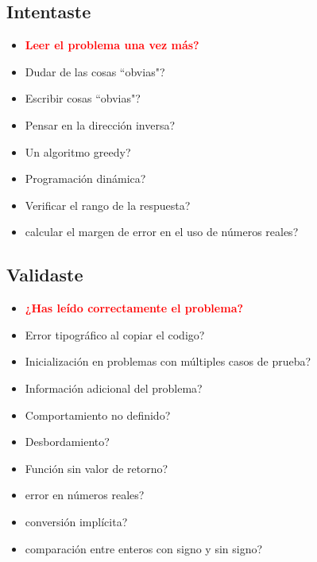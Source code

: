 \subsection{Intentaste}

\begin{itemize}
    \item \textcolor{red}{\textbf{Leer el problema una vez más?}}
    \item Dudar de las cosas ``obvias"?
    \item Escribir cosas ``obvias"?
    \item Pensar en la dirección inversa?
    \item Un algoritmo greedy?
    \item Programación dinámica?
    \item Verificar el rango de la respuesta?
    \item calcular el margen de error en el uso de números reales?
\end{itemize}

\subsection{Validaste}

\begin{itemize}
    \item \textcolor{red}{\textbf{¿Has leído correctamente el problema?}}
    \item Error tipográfico al copiar el codigo?
    \item Inicialización en problemas con múltiples casos de prueba?
    \item Información adicional del problema?
    \item Comportamiento no definido?
    \item Desbordamiento?
    \item Función sin valor de retorno?
    \item error en números reales?
    \item conversión implícita?
    \item comparación entre enteros con signo y sin signo?
\end{itemize}
